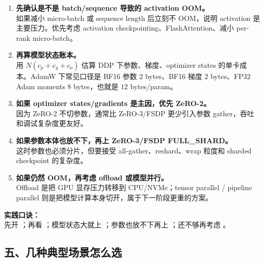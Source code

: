 \begin{enumerate}[leftmargin=1.5em]
  \item \textbf{先确认是不是 batch/sequence 导致的 activation OOM。}\\
  如果减小 micro-batch 或 sequence length 后立刻不 OOM，说明 activation 是主要压力。优先考虑 activation checkpointing、FlashAttention、减小 per-rank micro-batch。

  \item \textbf{再算模型状态账本。}\\
  用 $N(c_p+c_g+c_o)$ 估算 DDP 下参数、梯度、optimizer states 的单卡成本。AdamW 下常见口径是 BF16 参数 $2$ bytes、BF16 梯度 $2$ bytes、FP32 Adam moments $8$ bytes，也就是 $12$ bytes/param。

  \item \textbf{如果 optimizer states/gradients 是主因，优先 ZeRO-2。}\\
  因为 ZeRO-2 不切参数，通常比 ZeRO-3/FSDP 更少引入参数 gather，吞吐和调试复杂度更友好。

  \item \textbf{如果参数本体也放不下，再上 ZeRO-3/FSDP FULL\_SHARD。}\\
  这时参数也必须分片，但要接受 all-gather、reshard、wrap 粒度和 sharded checkpoint 的复杂度。

  \item \textbf{如果仍然 OOM，再考虑 offload 或模型并行。}\\
  Offload 是把 GPU 显存压力转移到 CPU/NVMe；tensor parallel / pipeline parallel 则是把模型计算本身切开，属于下一阶段更重的方案。
\end{enumerate}

\begin{summarybox}
\textbf{实践口诀：}\\
先开 ；再看 ；模型状态大就上 ；参数也放不下再上 ；还不够再考虑 。
\end{summarybox}

\subsection{五、几种典型场景怎么选}

